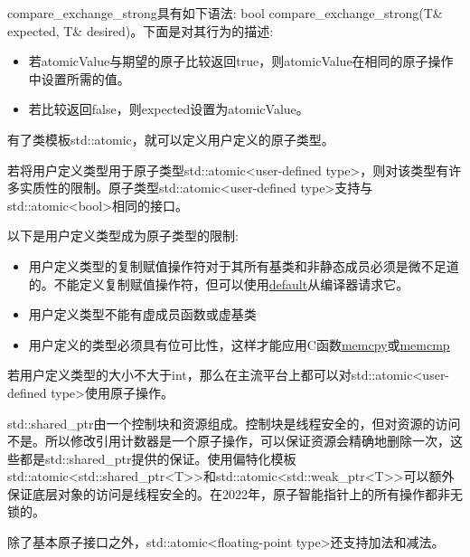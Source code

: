 compare\_exchange\_strong具有如下语法: bool compare\_exchange\_strong(T\& expected, T\& desired)。下面是对其行为的描述:

\begin{itemize}
\item 
若atomicValue与期望的原子比较返回true，则atomicValue在相同的原子操作中设置所需的值。

\item 
若比较返回false，则expected设置为atomicValue。
\end{itemize}


有了类模板std::atomic，就可以定义用户定义的原子类型。

若将用户定义类型用于原子类型std::atomic<user-defined type>，则对该类型有许多实质性的限制。原子类型std::atomic<user-defined type>支持与std::atomic<bool>相同的接口。

以下是用户定义类型成为原子类型的限制:

\begin{itemize}
\item 
用户定义类型的复制赋值操作符对于其所有基类和非静态成员必须是微不足道的。不能定义复制赋值操作符，但可以使用\href{http://en.cppreference.com/w/cpp/keyword/default}{default}从编译器请求它。

\item 
用户定义类型不能有虚成员函数或虚基类

\item 
用户定义的类型必须具有位可比性，这样才能应用C函数\href{http://en.cppreference.com/w/cpp/string/byte/memcpy}{memcpy}或\href{http://en.cppreference.com/w/cpp/string/byte/memcmp}{memcmp}
\end{itemize}

若用户定义类型的大小不大于int，那么在主流平台上都可以对std::atomic<user-defined type>使用原子操作。


std::shared\_ptr由一个控制块和资源组成。控制块是线程安全的，但对资源的访问不是。所以修改引用计数器是一个原子操作，可以保证资源会精确地删除一次，这些都是std::shared\_ptr提供的保证。使用偏特化模板std::atomic<std::shared\_ptr<T>{}>和std::atomic<std::weak\_ptr<T>{}>可以额外保证底层对象的访问是线程安全的。在2022年，原子智能指针上的所有操作都非无锁的。


除了基本原子接口之外，std::atomic<floating-point type>还支持加法和减法。

